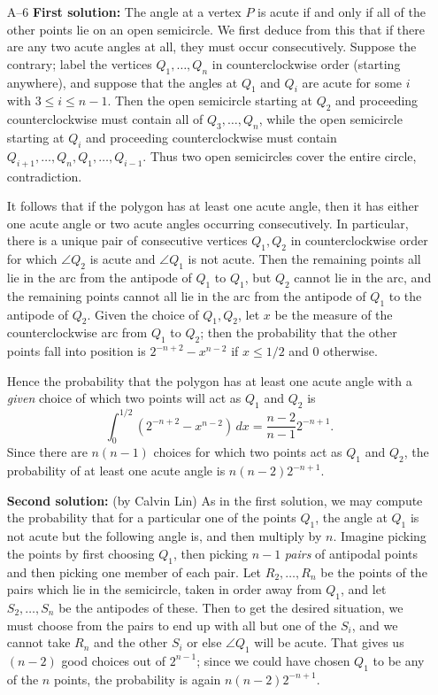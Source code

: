 \documentclass[amssymb,twocolumn,pra,10pt,aps]{revtex4-1}
\begin{document}
\begin{itemize}
\item[A--6]
\textbf{First solution:}
The angle at a vertex $P$ is acute if and only if all of the other points
lie on an open semicircle. We first deduce from this that if there are any
two acute angles at all, they must occur consecutively. Suppose the contrary;
label the vertices $Q_1, \dots, Q_n$ in counterclockwise order (starting anywhere),
and suppose that the angles at $Q_1$ and $Q_i$ are acute for some $i$
with $3 \leq i \leq n-1$.
Then the open semicircle starting at $Q_2$ and proceeding counterclockwise
must contain all of $Q_3, \dots, Q_n$, while the open semicircle starting at
$Q_i$ and proceeding counterclockwise must contain $Q_{i+1}, \dots,
Q_n, Q_1, \dots, Q_{i-1}$. Thus two open semicircles cover the entire circle,
contradiction.

It follows that if the polygon has at least one acute angle, then
it has either one acute angle or two acute angles
occurring consecutively. In particular, there
is a unique pair of consecutive vertices $Q_1, Q_2$ in counterclockwise order
for which $\angle Q_2$ is acute and $\angle Q_1$ is not acute.
Then the remaining points all lie in the arc from the antipode of $Q_1$
to $Q_1$, but $Q_2$ cannot lie in the arc, and the remaining points
cannot all lie in the arc from the antipode of $Q_1$ to the antipode
of $Q_2$. Given the choice of $Q_1, Q_2$, let $x$ be the measure of
the counterclockwise arc from $Q_1$ to $Q_2$; then the probability that
the other points fall into position is
$2^{-n+2} - x^{n-2}$ if $x \leq 1/2$ and 0 otherwise.

Hence the probability that the polygon has at least one acute angle with
a \emph{given} choice of which two points will act as $Q_1$ and $Q_2$ is
\[
\int_0^{1/2} (2^{-n+2} - x^{n-2})\,dx
= \frac{n-2}{n-1} 2^{-n+1}.
\]
Since there are $n(n-1)$ choices for which two points act as $Q_1$ and $Q_2$,
the probability of at least one acute angle is $n(n-2) 2^{-n+1}$.

\textbf{Second solution:}
(by Calvin Lin)
As in the first solution, we may compute the probability that for a
particular one of the points $Q_1$, the angle at $Q_1$ is not acute but
the following angle is, and then multiply by $n$.
Imagine picking the points by first choosing $Q_1$, then
picking $n-1$ \emph{pairs}
of antipodal points and then picking one
member of each pair. Let $R_2, \dots, R_n$ be the points of the pairs
which lie in the semicircle, taken in order away from $Q_1$,
and let $S_2, \dots, S_n$ be the antipodes of these. Then to
get the desired situation,
we must choose from the pairs to end up with all but one of the
$S_i$, and we cannot take $R_n$ and the other $S_i$ or else $\angle Q_1$ will be
acute. That gives us $(n-2)$ good choices out of $2^{n-1}$; since we could
have chosen $Q_1$ to be any of the $n$ points, the probability is again
$n(n-2) 2^{-n+1}$.


\end{itemize}
\end{document}
